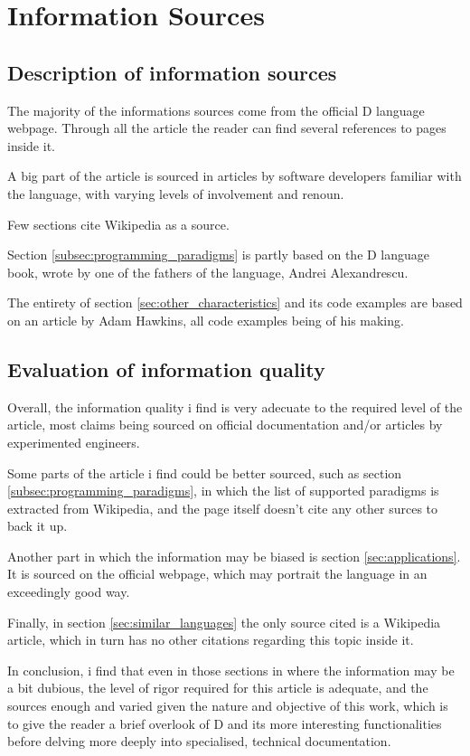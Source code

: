 \section{Information Sources} \label{sec:information_sources}

\subsection{Description of information sources}\label{subsec:description_of_information sources}

The majority of the informations sources come from the official D language webpage. Through all the article the reader can find several references to pages inside it.

A big part of the article is sourced in articles by software developers familiar with the language, with varying levels of involvement and renoun.

Few sections cite Wikipedia as a source.

Section \ref{subsec:programming_paradigms} is partly based on the D language book, wrote by one of the fathers of the language, Andrei Alexandrescu.

The entirety of section \ref{sec:other_characteristics} and its code examples are based on an article by Adam Hawkins, all code examples being of his making.

\subsection{Evaluation of information quality}\label{subsec:evaluation_of_information quality}

Overall, the information quality i find is very adecuate to the required level of the article, most claims being sourced on official documentation and/or articles by experimented engineers.

Some parts of the article i find could be better sourced, such as section \ref{subsec:programming_paradigms}, in which the list of supported paradigms is extracted from Wikipedia, and the page itself doesn't cite any other surces to back it up.

Another part in which the information may be biased is section \ref{sec:applications}. It is sourced on the official webpage, which may portrait the language in an exceedingly good way.

Finally, in section \ref{sec:similar_languages} the only source cited is a Wikipedia article, which in turn has no other citations regarding this topic inside it.

In conclusion, i find that even in those sections in where the information may be a bit dubious, the level of rigor required for this article is adequate, and the sources enough and varied given the nature and objective of this work, which is to give the reader a brief overlook of D and its more interesting functionalities before delving more deeply into specialised, technical documentation.
